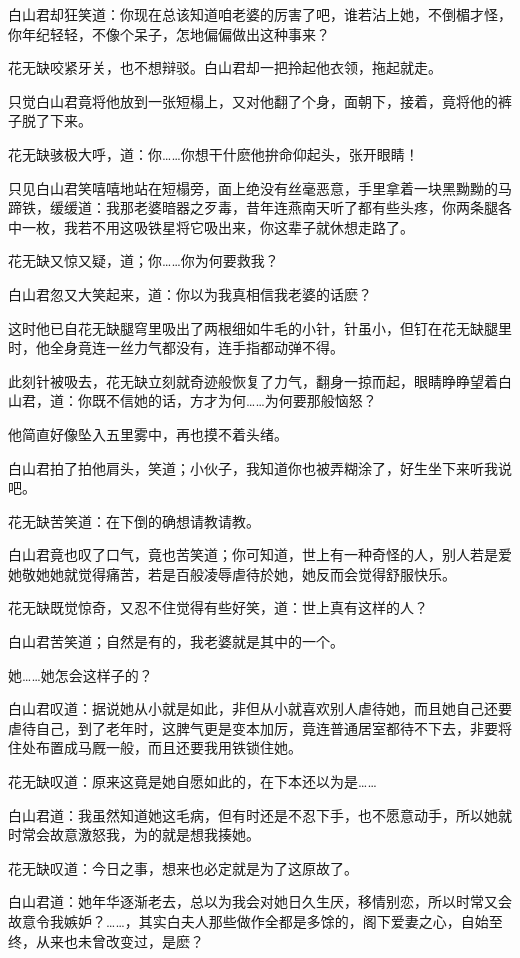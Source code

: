 \documentclass[12pt,oneside]{book}
\begin{document}
白山君却狂笑道：你现在总该知道咱老婆的厉害了吧，谁若沾上她，不倒楣才怪，你年纪轻轻，不像个呆子，怎地偏偏做出这种事来？

花无缺咬紧牙关，也不想辩驳。白山君却一把拎起他衣领，拖起就走。

只觉白山君竟将他放到一张短榻上，又对他翻了个身，面朝下，接着，竟将他的裤子脱了下来。

花无缺骇极大呼，道：你\ldots\ldots 你想干什麽他拚命仰起头，张开眼睛！

只见白山君笑嘻嘻地站在短榻旁，面上绝没有丝毫恶意，手里拿着一块黑黝黝的马蹄铁，缓缓道：我那老婆暗器之歹毒，昔年连燕南天听了都有些头疼，你两条腿各中一枚，我若不用这吸铁星将它吸出来，你这辈子就休想走路了。

花无缺又惊又疑，道；你\ldots\ldots 你为何要救我？

白山君忽又大笑起来，道：你以为我真相信我老婆的话麽？

这时他已自花无缺腿穹里吸出了两根细如牛毛的小针，针虽小，但钉在花无缺腿里时，他全身竟连一丝力气都没有，连手指都动弹不得。

此刻针被吸去，花无缺立刻就奇迹般恢复了力气，翻身一掠而起，眼睛睁睁望着白山君，道：你既不信她的话，方才为何\ldots\ldots 为何要那般恼怒？

他简直好像坠入五里雾中，再也摸不着头绪。

白山君拍了拍他肩头，笑道；小伙子，我知道你也被弄糊涂了，好生坐下来听我说吧。

花无缺苦笑道：在下倒的确想请教请教。

白山君竟也叹了口气，竟也苦笑道；你可知道，世上有一种奇怪的人，别人若是爱她敬她她就觉得痛苦，若是百般凌辱虐待於她，她反而会觉得舒服快乐。

花无缺既觉惊奇，又忍不住觉得有些好笑，道：世上真有这样的人？

白山君苦笑道；自然是有的，我老婆就是其中的一个。

她\ldots\ldots 她怎会这样子的？

白山君叹道：据说她从小就是如此，非但从小就喜欢别人虐待她，而且她自己还要虐待自己，到了老年时，这脾气更是变本加厉，竟连普通居室都待不下去，非要将住处布置成马厩一般，而且还要我用铁锁住她。

花无缺叹道：原来这竟是她自愿如此的，在下本还以为是\ldots\ldots{}

白山君道：我虽然知道她这毛病，但有时还是不忍下手，也不愿意动手，所以她就时常会故意激怒我，为的就是想我揍她。

花无缺叹道：今日之事，想来也必定就是为了这原故了。

白山君道：她年华逐渐老去，总以为我会对她日久生厌，移情别恋，所以时常又会故意令我嫉妒？\ldots\ldots，其实白夫人那些做作全都是多馀的，阁下爱妻之心，自始至终，从来也未曾改变过，是麽？
\end{document}
